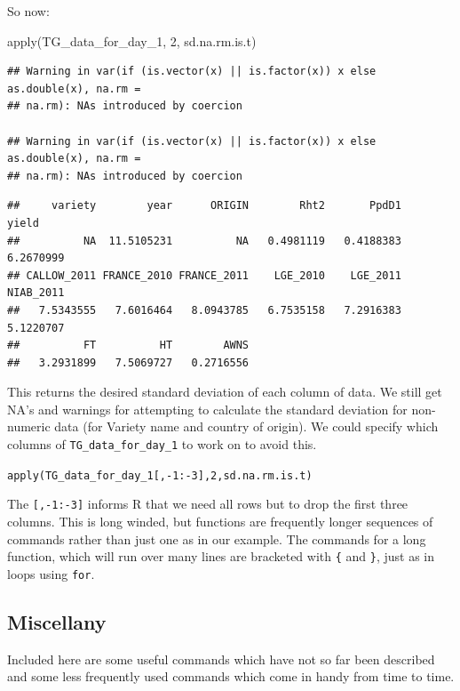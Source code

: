 \documentclass[
]{book}
\newenvironment{Shaded}{\begin{snugshade}}{\end{snugshade}}
\newcommand{\DecValTok}[1]{\textcolor[rgb]{0.00,0.00,0.81}{#1}}
\newcommand{\FunctionTok}[1]{\textcolor[rgb]{0.00,0.00,0.00}{#1}}
\newcommand{\NormalTok}[1]{#1}
\begin{document}
So now:

\begin{Shaded}
\begin{Highlighting}[]
\FunctionTok{apply}\NormalTok{(TG\_data\_for\_day\_1, }\DecValTok{2}\NormalTok{, sd.na.rm.is.t)}
\end{Highlighting}
\end{Shaded}

\begin{verbatim}
## Warning in var(if (is.vector(x) || is.factor(x)) x else as.double(x), na.rm =
## na.rm): NAs introduced by coercion

## Warning in var(if (is.vector(x) || is.factor(x)) x else as.double(x), na.rm =
## na.rm): NAs introduced by coercion
\end{verbatim}

\begin{verbatim}
##     variety        year      ORIGIN        Rht2       PpdD1       yield 
##          NA  11.5105231          NA   0.4981119   0.4188383   6.2670999 
## CALLOW_2011 FRANCE_2010 FRANCE_2011    LGE_2010    LGE_2011   NIAB_2011 
##   7.5343555   7.6016464   8.0943785   6.7535158   7.2916383   5.1220707 
##          FT          HT        AWNS 
##   3.2931899   7.5069727   0.2716556
\end{verbatim}

This returns the desired standard deviation of each column of data. We still get NA's and warnings for attempting to calculate the standard deviation for non-numeric data (for Variety name and country of origin). We could specify which columns of \texttt{TG\_data\_for\_day\_1} to work on to avoid this.

\texttt{apply(TG\_data\_for\_day\_1{[},-1:-3{]},2,sd.na.rm.is.t)}

The \texttt{{[},-1:-3{]}} informs R that we need all rows but to drop the first three columns.
This is long winded, but functions are frequently longer sequences of commands rather than just one as in our example. The commands for a long function, which will run over many lines are bracketed with \texttt{\{} and \texttt{\}}, just as in loops using \texttt{for}.

\hypertarget{miscellany}{%
\subsection{Miscellany}\label{miscellany}}

Included here are some useful commands which have not so far been described and some less frequently used commands which come in handy from time to time.
\end{document}
